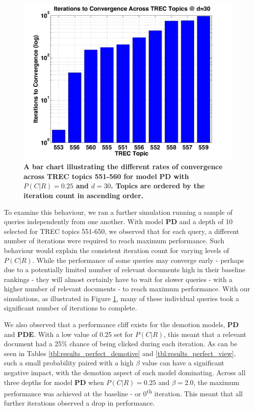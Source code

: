 \begin{figure}
	\begin{center}
	\includegraphics[width=\linewidth]{pics/perfect/perfect_different_topics.pdf}
	\end{center}
	\vspace{-0.5cm}
	\caption{\label{fig:perfect_different_topics}\textbf{A bar chart illustrating the different rates of convergence across TREC topics 551-560 for model \textbf{PD} with $P(C|R) = 0.25$ and $d=30$. Topics are ordered by the iteration count in ascending order.}\vspace{-0.4cm}}
\end{figure}

To examine this behaviour, we ran a further simulation running a sample of queries independently from one another. With model \textbf{PD} and a depth of 10 selected for TREC topics 551-650, we observed that for each query, a different number of iterations were required to reach maximum performance. Such behaviour would explain the consistent iteration count for varying levels of $P(C|R)$. While the performance of some queries may converge early - perhaps due to a potentially limited number of relevant documents high in their baseline rankings - they will almost certainly have to wait for slower queries - with a higher number of relevant documents - to reach maximum performance. With our simulations, as illustrated in Figure \ref{fig:perfect_different_topics}, many of these individual queries took a significant number of iterations to complete.

We also observed that a performance cliff exists for the demotion models, \textbf{PD} and \textbf{PDE}. With a low value of 0.25 set for $P(C|R)$, this meant that a relevant document had a 25\% chance of being clicked during each iteration. As can be seen in Tables \ref{tbl:results_perfect_demotive} and \ref{tbl:results_perfect_view}, such a small probability paired with a high $\beta$ value can have a significant negative impact, with the demotion aspect of each model dominating. Across all three depths for model \textbf{PD} when $P(C|R) = 0.25$ and $\beta = 2.0$, the maximum performance was achieved at the baseline - or 0\textsuperscript{th} iteration. This meant that all further iterations observed a drop in performance.

